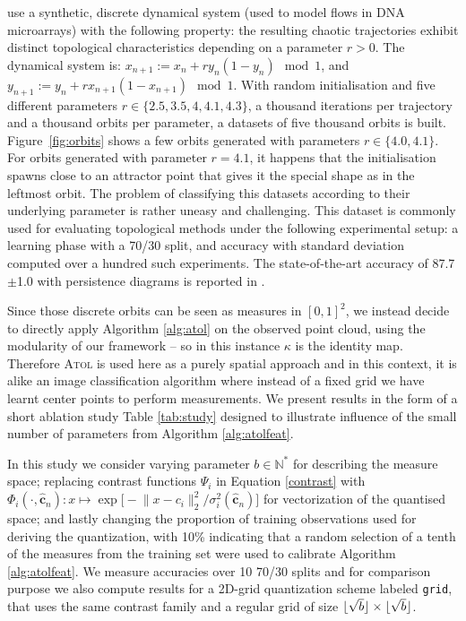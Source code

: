 \documentclass[twoside]{article}
\DeclarePairedDelimiter\floor{\lfloor}{\rfloor}
\newcommand{\cb}{\mathbf{c}}
\begin{document}
\cite{Adams2017} use a synthetic, discrete dynamical system (used to model flows in DNA microarrays) with the following property: the resulting chaotic trajectories exhibit distinct topological characteristics depending on a parameter $r>0$. The dynamical system is: $x_{n+1} := x_n + r y_n (1-y_n) \mod 1$, and $y_{n+1} := y_n + r x_{n+1} (1-x_{n+1}) \mod 1$. With random initialisation and five different parameters $r \in \{2.5, 3.5, 4, 4.1, 4.3\}$, a thousand iterations per trajectory and a thousand orbits per parameter, a datasets of five thousand orbits is built. Figure~\ref{fig:orbits} shows a few orbits generated with parameters $r \in \{4.0, 4.1\}$. For orbits generated with parameter $r=4.1$, it happens that the initialisation spawns close to an attractor point that gives it the special shape as in the leftmost orbit. The problem of classifying this datasets according to their underlying parameter is rather uneasy and challenging. This dataset is commonly used for evaluating topological methods under the following experimental setup: a learning phase with a 70/30 split, and accuracy with standard deviation computed over a hundred such experiments. The
state-of-the-art accuracy of 87.7$\pm$1.0 with persistence diagrams is reported in \cite{perslay}.

Since those discrete orbits can be seen as measures in $[0,1]^2$, we instead decide to directly apply Algorithm \ref{alg:atol} on the observed point cloud, using the modularity of our framework \--- so in this instance $\kappa$ is the identity map. Therefore \textsc{Atol} is used here as a purely spatial approach and in this context, it is alike an image classification algorithm where instead of a fixed grid we have learnt center points to perform measurements. We present results in the form of a short ablation study Table \ref{tab:study} designed to illustrate influence of the small number of parameters from Algorithm \ref{alg:atolfeat}.

In this study we consider varying parameter $b \in \mathbb{N}^*$ for describing the measure space; replacing contrast functions $\Psi_i$ in Equation \eqref{contrast} with $\Phi_i(\cdot, \hat{\cb}_n) : x \mapsto \exp\big[-{\|x - c_i\|_2^2} / {\sigma^2_i(\hat{\cb}_n)} \big]$ for vectorization of the quantised space; and lastly changing the proportion of training observations used for deriving the quantization, with 10\% indicating that a random selection of a tenth of the measures from the training set were used to calibrate Algorithm \ref{alg:atolfeat}. We measure accuracies over 10 70/30 splits and for comparison purpose we also compute results for a 2D-grid quantization scheme labeled \texttt{grid}, that uses the same contrast family and a regular grid of size $\floor{\sqrt{b}} \times \floor{\sqrt{b}}$.
\end{document}
